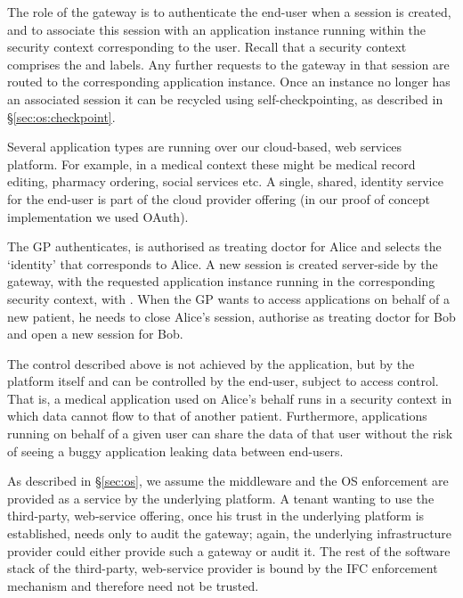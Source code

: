 \documentclass[10pt,journal,compsoc]{IEEEtran}
\begin{document}
The role of the gateway is to authenticate the end-user when a session is created, and to associate this session with an application instance running within the security context corresponding to the user. Recall that a security context comprises the  and  labels. Any further requests to the gateway in that session are routed to the corresponding application instance. Once an instance no longer has an associated session it can be recycled using self-checkpointing, as described in \S\ref{sec:os:checkpoint}.



Several application types are running over our cloud-based, web services platform. For example, in a medical context these might be medical record editing, pharmacy ordering, social services etc.
A single, shared, identity service for the end-user is part of the cloud provider offering (in our proof of concept implementation we used OAuth\cite{hardt2012oauth}).


The GP authenticates, is authorised as treating doctor for Alice and selects the `identity' that corresponds to Alice. A new session is created server-side by the gateway, 
with the requested application instance running in the corresponding security context, 
with .
When the GP wants to access applications on behalf of a new patient, he needs to close Alice's session, authorise as treating doctor for Bob and open a new session for Bob. 


The control described above is not achieved by the application, but by the platform itself and can be controlled by the end-user, subject to access control. 
That is, a medical application used on Alice's behalf runs in a security context in which data cannot flow to that of another patient. 
Furthermore, applications running on behalf of a given user can share the data of that user without the risk of seeing a buggy application leaking data between end-users.

As described in \S\ref{sec:os}, we assume the middleware and the OS enforcement are provided as a service by the underlying platform. 
A tenant wanting to use the third-party, web-service offering, once his trust in the underlying platform is established, needs only to audit the gateway; again, the underlying infrastructure provider could either provide such a gateway or audit it.
The rest of the software stack of the third-party, web-service provider is bound by the IFC enforcement mechanism and therefore need not be trusted.
\end{document}
